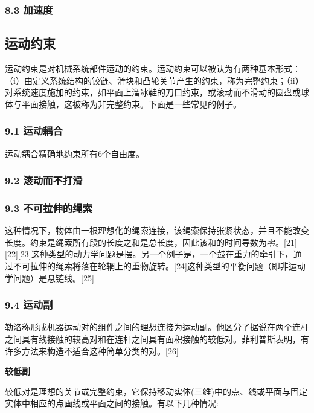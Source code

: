 \subsubsection{8.3 加速度}



\subsection{运动约束}

运动约束是对机械系统部件运动的约束。运动约束可以被认为有两种基本形式：（i）由定义系统结构的铰链、滑块和凸轮关节产生的约束，称为完整约束；（ii）对系统速度施加的约束，如平面上溜冰鞋的刀口约束，或滚动而不滑动的圆盘或球体与平面接触，这被称为非完整约束。下面是一些常见的例子。

\subsubsection{9.1 运动耦合}

运动耦合精确地约束所有6个自由度。

\subsubsection{9.2 滚动而不打滑}



\subsubsection{9.3 不可拉伸的绳索}

这种情况下，物体由一根理想化的绳索连接，该绳索保持张紧状态，并且不能改变长度。约束是绳索所有段的长度之和是总长度，因此该和的时间导数为零。[21][22][23]这种类型的动力学问题是摆。另一个例子是，一个鼓在重力的牵引下，通过不可拉伸的绳索将落在轮辋上的重物旋转。[24]这种类型的平衡问题（即非运动学问题）是悬链线。[25]

\subsubsection{9.4 运动副}

勒洛称形成机器运动对的组件之间的理想连接为运动副。他区分了据说在两个连杆之间具有线接触的较高对和在连杆之间具有面积接触的较低对。菲利普斯表明，有许多方法来构造不适合这种简单分类的对。[26]

\textbf{较低副}

较低对是理想的关节或完整约束，它保持移动实体(三维)中的点、线或平面与固定实体中相应的点画线或平面之间的接触。有以下几种情况:

